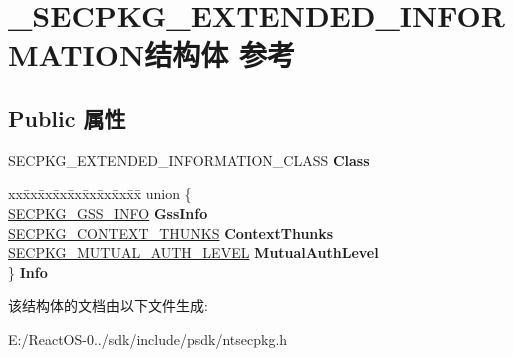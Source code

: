 \hypertarget{struct___s_e_c_p_k_g___e_x_t_e_n_d_e_d___i_n_f_o_r_m_a_t_i_o_n}{}\section{\+\_\+\+S\+E\+C\+P\+K\+G\+\_\+\+E\+X\+T\+E\+N\+D\+E\+D\+\_\+\+I\+N\+F\+O\+R\+M\+A\+T\+I\+O\+N结构体 参考}
\label{struct___s_e_c_p_k_g___e_x_t_e_n_d_e_d___i_n_f_o_r_m_a_t_i_o_n}
\subsection*{Public 属性}
\begin{DoxyCompactItemize}
\item 
\mbox{\label{struct___s_e_c_p_k_g___e_x_t_e_n_d_e_d___i_n_f_o_r_m_a_t_i_o_n_a7659261ff904a91ae317242fafa3878a}} 
S\+E\+C\+P\+K\+G\+\_\+\+E\+X\+T\+E\+N\+D\+E\+D\+\_\+\+I\+N\+F\+O\+R\+M\+A\+T\+I\+O\+N\+\_\+\+C\+L\+A\+SS {\bfseries Class}
\item 
\mbox{\label{struct___s_e_c_p_k_g___e_x_t_e_n_d_e_d___i_n_f_o_r_m_a_t_i_o_n_a25b73aedf623a6bdedb728d958d15373}} 
\begin{tabbing}
xx\=xx\=xx\=xx\=xx\=xx\=xx\=xx\=xx\=\kill
union \{\\
\>\hyperlink{struct___s_e_c_p_k_g___g_s_s___i_n_f_o}{SECPKG\_GSS\_INFO} {\bfseries GssInfo}\\
\>\hyperlink{struct___s_e_c_p_k_g___c_o_n_t_e_x_t___t_h_u_n_k_s}{SECPKG\_CONTEXT\_THUNKS} {\bfseries ContextThunks}\\
\>\hyperlink{struct___s_e_c_p_k_g___m_u_t_u_a_l___a_u_t_h___l_e_v_e_l}{SECPKG\_MUTUAL\_AUTH\_LEVEL} {\bfseries MutualAuthLevel}\\
\} {\bfseries Info}\\

\end{tabbing}\end{DoxyCompactItemize}


该结构体的文档由以下文件生成\+:\begin{DoxyCompactItemize}
\item 
E\+:/\+React\+O\+S-\/0../sdk/include/psdk/ntsecpkg.\+h\end{DoxyCompactItemize}

